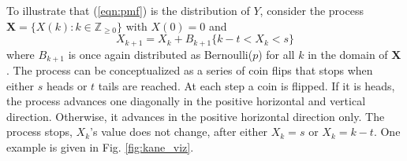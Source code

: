\documentclass[12pt]{article}         %
\begin{document}

To illustrate that (\ref{eqn:pmf}) is the distribution of $Y$, consider the 
process $\mathbf{X} = \{X(k) : k \in \mathbb{Z}_{\ge 0} \}$ with $X(0)=0$ and
\begin{equation*} \label{eqn:proc}
X_{k+1} = X_k + B_{k+1} \{ k-t < X_k < s \}
\end{equation*}
where $B_{k+1}$ is once again distributed as Bernoulli($p$) for all $k$ in the domain of $\mathbf{X}$. The process can be conceptualized as a series of coin flips that stops when either $s$ heads or $t$ tails are reached. At each step a coin is flipped. If it is heads, the process advances one diagonally in the positive horizontal and vertical direction. Otherwise, it advances in the positive horizontal direction only. The process stops, $X_k$'s value does not change, after either $X_k = s$ or $X_k = k-t$. One example is given in Fig. \ref{fig:kane_viz}.
\end{document}

